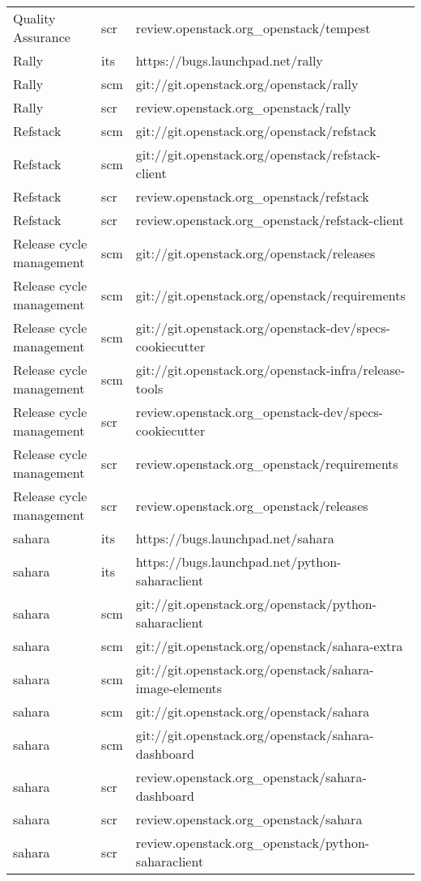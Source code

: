 \begin{center}
\begin{longtable}{|p{4cm}|p{1cm}|p{10cm}|}
Quality Assurance&scr&review.openstack.org\_openstack/tempest\\ 
Rally&its&https://bugs.launchpad.net/rally\\ 
Rally&scm&git://git.openstack.org/openstack/rally\\ 
Rally&scr&review.openstack.org\_openstack/rally\\ 
Refstack&scm&git://git.openstack.org/openstack/refstack\\ 
Refstack&scm&git://git.openstack.org/openstack/refstack-client\\ 
Refstack&scr&review.openstack.org\_openstack/refstack\\ 
Refstack&scr&review.openstack.org\_openstack/refstack-client\\ 
Release cycle management&scm&git://git.openstack.org/openstack/releases\\ 
Release cycle management&scm&git://git.openstack.org/openstack/requirements\\ 
Release cycle management&scm&git://git.openstack.org/openstack-dev/specs-cookiecutter\\ 
Release cycle management&scm&git://git.openstack.org/openstack-infra/release-tools\\ 
Release cycle management&scr&review.openstack.org\_openstack-dev/specs-cookiecutter\\ 
Release cycle management&scr&review.openstack.org\_openstack/requirements\\ 
Release cycle management&scr&review.openstack.org\_openstack/releases\\ 
sahara&its&https://bugs.launchpad.net/sahara\\ 
sahara&its&https://bugs.launchpad.net/python-saharaclient\\ 
sahara&scm&git://git.openstack.org/openstack/python-saharaclient\\ 
sahara&scm&git://git.openstack.org/openstack/sahara-extra\\ 
sahara&scm&git://git.openstack.org/openstack/sahara-image-elements\\ 
sahara&scm&git://git.openstack.org/openstack/sahara\\ 
sahara&scm&git://git.openstack.org/openstack/sahara-dashboard\\ 
sahara&scr&review.openstack.org\_openstack/sahara-dashboard\\ 
sahara&scr&review.openstack.org\_openstack/sahara\\ 
sahara&scr&review.openstack.org\_openstack/python-saharaclient\\ 

\end{longtable}
\end{center}
